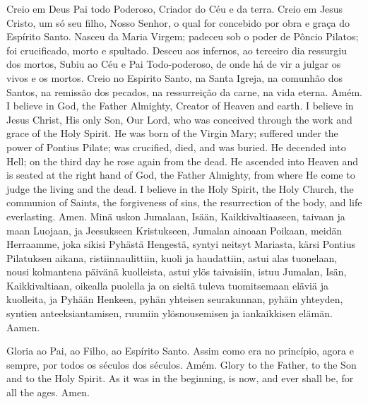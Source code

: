   \beginverse
    Creio em Deus Pai todo Poderoso,
    Criador do Céu e da terra.
    \parspace
    Creio em Jesus Cristo, um só seu filho,
    Nosso Senhor, o qual for concebido
    por obra e graça do Espírito Santo.
    Nasceu da Maria Virgem;
    padeceu sob o poder de Pôncio Pilatos;
    foi crucificado, morto e spultado.
    Desceu aos infernos, ao terceiro dia
    ressurgiu dos mortos, Subiu ao Céu e
    Pai Todo-poderoso, de onde há de vir
    a julgar os vivos e os mortos.
    \parspace
    Creio no Espirito Santo, na Santa Igreja,
    na comunhão dos Santos, na remissão
    dos pecados, na ressurreição da carne,
    na vida eterna.
    \parspace
    Amém.
  \endverse
  \beginverse
    I believe in God, the Father Almighty,
    Creator of Heaven and earth.
    \parspace
    I believe in Jesus Christ, His only Son,
    Our Lord, who was conceived through
    the work and grace of the Holy Spirit.
    He was born of the Virgin Mary;
    suffered under the power of Pontius Pilate;
    was crucified, died, and was buried.
    He decended into Hell; on the third day
    he rose again from the dead.
    He ascended into Heaven and is
    seated at the right hand of God,
    the Father Almighty, from where He come
    to judge the living and the dead.
    \parspace
    I believe in the Holy Spirit, the Holy Church,
    the communion of Saints, the forgiveness of sins,
    the resurrection of the body, and life everlasting.
    \parspace
    Amen.    
  \endverse
  \beginverse
    Minä uskon Jumalaan,
    Isään, Kaikkivaltiaaseen,
    taivaan ja maan Luojaan,
    \parspace
    ja Jeesukseen Kristukseen,
    Jumalan ainoaan Poikaan, meidän Herraamme,
    joka sikisi Pyhästä Hengestä,
    syntyi neitsyt Mariasta,
    kärsi Pontius Pilatuksen aikana,
    ristiinnaulittiin, kuoli ja haudattiin,
    astui alas tuonelaan,
    nousi kolmantena päivänä kuolleista,
    astui ylös taivaisiin,
    istuu Jumalan, Isän, Kaikkivaltiaan, oikealla puolella
    ja on sieltä tuleva tuomitsemaan eläviä ja kuolleita,
    \parspace
    ja Pyhään Henkeen,
    pyhän yhteisen seurakunnan,
    pyhäin yhteyden,
    syntien anteeksiantamisen,
    ruumiin ylösnousemisen
    ja iankaikkisen elämän.
    \parspace
    Aamen.
  \endverse
\endsong


  \beginverse
    \parspace
    Gloria ao Pai, ao Filho, ao Espírito Santo.
    Assim como era no princípio, agora e sempre,
    por todos os séculos dos séculos.
    \parspace
    Amém.
  \endverse
  \beginverse
    Glory to the Father, to the Son and to the Holy Spirit.
    As it was in the beginning, is now, and ever shall be,
    for all the ages.
    \parspace
    Amen.
  \endverse
\endsong


